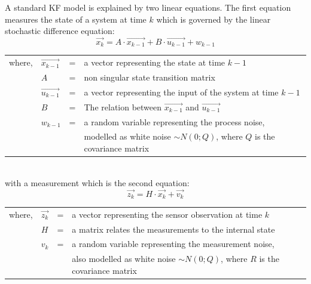 A standard KF model is explained by two linear equations\cite{Wilfried2002}. The first equation measures the state of a system at time $k$ which is governed by the linear stochastic difference equation\cite{aich2010study}:
$$\vec{x_{k}} = A \cdot \vec{x_{k-1}} + B \cdot \vec{u_{k-1}} + w_{k-1}$$
\begin{table}[!htbp]
\centering
\label{my-label}
\begin{tabular}{llll}
where, & $\vec{x_{k-1}}$     & = & a vector representing the state at time $k-1$                                                                                                                                         \\
       & $A$       & = & non singular state transition matrix                                                                                                                                                  \\
       & $\vec{u_{k-1}}$     & = & a vector representing the input of the system at time $k-1$                                                                                                                           \\
       & $B$       & = & The relation between $\vec{x_{k-1}}$ and $\vec{u_{k-1}}$                                                                                                                                                  \\
       & $w_{k-1}$ & = & a random variable representing the process noise, \\
       &        & & modelled as white noise $\sim N(0; Q)$, where $Q$ is the covariance matrix
\end{tabular}
\end{table}\\
with a measurement which is the second equation\cite{aich2010study}:
$$\vec{z_{k}} = H \cdot \vec{x_{k}} + \vec{v_{k}} $$
\begin{table}[!htbp]
\centering
\label{my-label}
\begin{tabular}{llll}
where, & $\vec{z_{k}}$     & = & a vector representing the sensor observation at time $k$                                                                                                                                         \\
       & $H$       & = & a matrix relates the measurements to the internal state                                                                                                                                            \\
       & $v_{k}$ & = & a random variable representing the measurement noise, \\
       &        & & also modelled as white noise $\sim N(0; Q)$, where $R$ is the covariance matrix
\end{tabular}
\end{table}

